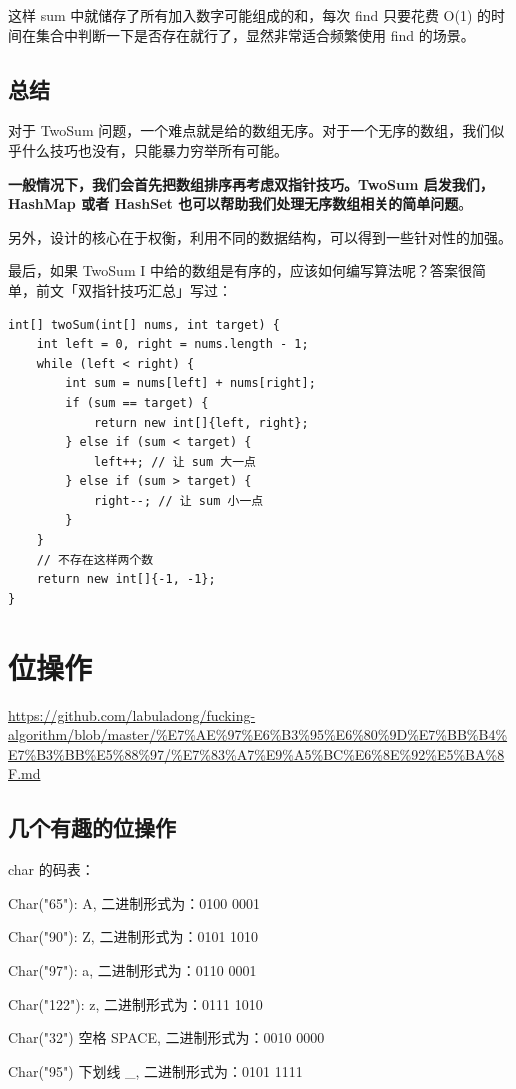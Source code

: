 \documentclass[12pt]{article}
\begin{document}
这样 sum 中就储存了所有加入数字可能组成的和，每次 find 只要花费 O(1) 的时间在集合中判断一下是否存在就行了，显然非常适合频繁使用 find 的场景。

\subsection{总结}
对于 TwoSum 问题，一个难点就是给的数组无序。对于一个无序的数组，我们似乎什么技巧也没有，只能暴力穷举所有可能。

\textbf{一般情况下，我们会首先把数组排序再考虑双指针技巧。TwoSum 启发我们，HashMap 或者 HashSet 也可以帮助我们处理无序数组相关的简单问题}。

另外，设计的核心在于权衡，利用不同的数据结构，可以得到一些针对性的加强。

最后，如果 TwoSum I 中给的数组是有序的，应该如何编写算法呢？答案很简单，前文「双指针技巧汇总」写过：
\begin{lstlisting}
int[] twoSum(int[] nums, int target) {
    int left = 0, right = nums.length - 1;
    while (left < right) {
        int sum = nums[left] + nums[right];
        if (sum == target) {
            return new int[]{left, right};
        } else if (sum < target) {
            left++; // 让 sum 大一点
        } else if (sum > target) {
            right--; // 让 sum 小一点
        }
    }
    // 不存在这样两个数
    return new int[]{-1, -1};
}
\end{lstlisting}

\section{位操作}
\url{https://github.com/labuladong/fucking-algorithm/blob/master/%E7%AE%97%E6%B3%95%E6%80%9D%E7%BB%B4%E7%B3%BB%E5%88%97/%E7%83%A7%E9%A5%BC%E6%8E%92%E5%BA%8F.md}
\subsection{几个有趣的位操作}
char 的码表：
\begin{framed}
Char("65"): A, 二进制形式为：0100 0001

Char("90"): Z, 二进制形式为：0101 1010

Char("97"): a, 二进制形式为：0110 0001

Char("122"): z, 二进制形式为：0111 1010

Char("32") 空格 SPACE, 二进制形式为：0010 0000

Char("95") 下划线 \_, 二进制形式为：0101 1111
\end{framed}
\end{document}
